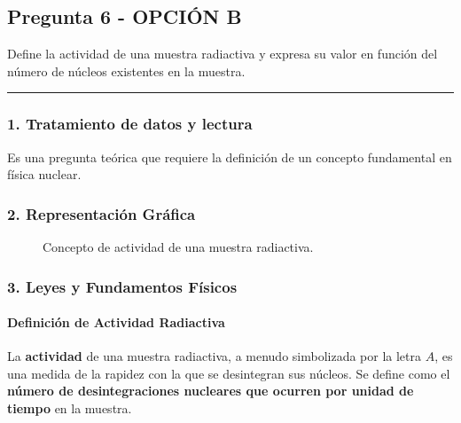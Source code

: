 \newpage

\subsection{Pregunta 6 - OPCIÓN B}
\label{subsec:6B_2008_sep_ext}

\begin{cajaenunciado}
Define la actividad de una muestra radiactiva y expresa su valor en función del número de núcleos existentes en la muestra.
\end{cajaenunciado}
\hrule

\subsubsection*{1. Tratamiento de datos y lectura}
Es una pregunta teórica que requiere la definición de un concepto fundamental en física nuclear.

\subsubsection*{2. Representación Gráfica}
\begin{figure}[H]
    \centering
    \caption{Concepto de actividad de una muestra radiactiva.}
\end{figure}

\subsubsection*{3. Leyes y Fundamentos Físicos}
\paragraph{Definición de Actividad Radiactiva}
La \textbf{actividad} de una muestra radiactiva, a menudo simbolizada por la letra $A$, es una medida de la rapidez con la que se desintegran sus núcleos. Se define como el \textbf{número de desintegraciones nucleares que ocurren por unidad de tiempo} en la muestra.

